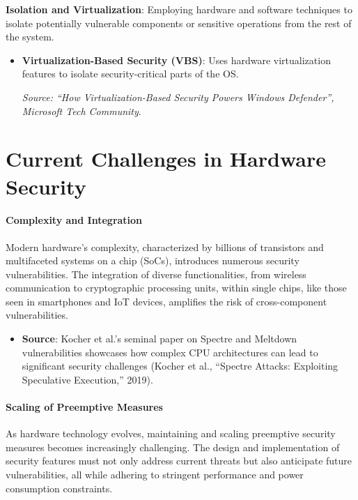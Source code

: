 \textbf{Isolation and Virtualization}: Employing hardware and software
techniques to isolate potentially vulnerable components or sensitive
operations from the rest of the system.

\begin{itemize}
\item
  \textbf{Virtualization-Based Security (VBS)}: Uses hardware
  virtualization features to isolate security-critical parts of the OS.

  \emph{Source: ``How Virtualization-Based Security Powers Windows
  Defender'', Microsoft Tech Community}.
\end{itemize}

\hypertarget{current-challenges-in-hardware-security}{%
\section{Current Challenges in Hardware
Security}\label{current-challenges-in-hardware-security}}

\hypertarget{complexity-and-integration}{%
\paragraph{Complexity and
Integration}\label{complexity-and-integration}}

Modern hardware's complexity, characterized by billions of transistors
and multifaceted systems on a chip (SoCs), introduces numerous security
vulnerabilities. The integration of diverse functionalities, from
wireless communication to cryptographic processing units, within single
chips, like those seen in smartphones and IoT devices, amplifies the
risk of cross-component vulnerabilities.

\begin{itemize}
\item
  \textbf{Source}: Kocher et al.'s seminal paper on Spectre and Meltdown
  vulnerabilities showcases how complex CPU architectures can lead to
  significant security challenges (Kocher et al., ``Spectre Attacks:
  Exploiting Speculative Execution,'' 2019).
\end{itemize}

\hypertarget{scaling-of-preemptive-measures}{%
\paragraph{Scaling of Preemptive
Measures}\label{scaling-of-preemptive-measures}}

As hardware technology evolves, maintaining and scaling preemptive
security measures becomes increasingly challenging. The design and
implementation of security features must not only address current
threats but also anticipate future vulnerabilities, all while adhering
to stringent performance and power consumption constraints.

